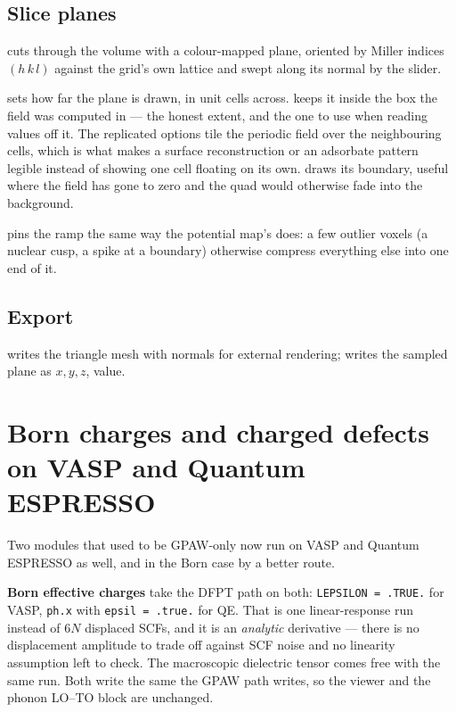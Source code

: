 \subsection{Slice planes}

 cuts through the volume with a colour-mapped plane, oriented
by Miller indices $(h\,k\,l)$ against the grid's own lattice and swept along its
normal by the  slider.

 sets how far the plane is drawn, in unit cells across.  keeps it inside the box the field was computed in --- the
honest extent, and the one to use when reading values off it. The replicated
options tile the periodic field over the neighbouring cells, which is what
makes a surface reconstruction or an adsorbate pattern legible instead of
showing one cell floating on its own.  draws its
boundary, useful where the field has gone to zero and the quad would otherwise
fade into the background.

 pins the ramp the same way the potential map's does:
a few outlier voxels (a nuclear cusp, a spike at a boundary) otherwise compress
everything else into one end of it.

\subsection{Export}

 writes the triangle mesh with normals
for external rendering;  writes the sampled
plane as $x, y, z$, value.

\section{Born charges and charged defects on VASP and Quantum ESPRESSO}
\label{sec:dfpt-engines}

Two modules that used to be GPAW-only now run on VASP and Quantum ESPRESSO as
well, and in the Born case by a better route.

\textbf{Born effective charges} take the DFPT path on both:
\texttt{LEPSILON = .TRUE.} for VASP, \texttt{ph.x} with
\texttt{epsil = .true.} for QE. That is one linear-response run instead of
$6N$ displaced SCFs, and it is an \emph{analytic} derivative --- there is no
displacement amplitude to trade off against SCF noise and no linearity
assumption left to check. The macroscopic dielectric tensor comes free with
the same run. Both write the same  the GPAW path
writes, so the viewer and the phonon LO--TO block are unchanged.


